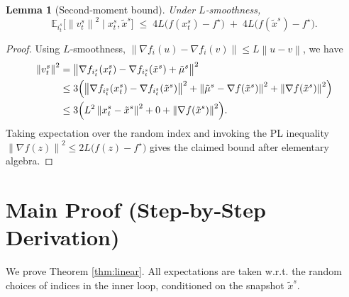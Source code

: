 \documentclass{article}
\newcommand{\E}{\mathbb{E}}
\newcommand{\norm}[1]{\left\lVert#1\right\rVert}
\newtheorem{lemma}{Lemma}
\begin{document}
\begin{lemma}[Second‑moment bound]\label{lem:variance}
Under $L$‑smoothness,
\[
\E_{i_t^{s}}\!\bigl[\norm{v_{t}^{s}}^{2}\mid x_{t}^{s},\tilde{x}^{s}\bigr]
\;\le\;
4L\bigl(f(x_{t}^{s})-f^{\star}\bigr)
\;+\;
4L\bigl(f(\tilde{x}^{s})-f^{\star}\bigr).
\]
\end{lemma}
\begin{proof}
Using $L$‑smoothness, $\norm{\nabla f_i(u)-\nabla f_i(v)}\le L\norm{u-v}$, we have
\[
\begin{aligned}
\norm{v_{t}^{s}}^{2}
&=\norm{\nabla f_{i_t^{s}}(x_{t}^{s})-\nabla f_{i_t^{s}}(\tilde{x}^{s})+\tilde{\mu}^{s}}^{2}\\
&\le 3\Bigl(\norm{\nabla f_{i_t^{s}}(x_{t}^{s})-\nabla f_{i_t^{s}}(\tilde{x}^{s})}^{2}
      +\norm{\tilde{\mu}^{s}-\nabla f(\tilde{x}^{s})}^{2}
      +\norm{\nabla f(\tilde{x}^{s})}^{2}\Bigr)\\
&\le 3\Bigl(L^{2}\norm{x_{t}^{s}-\tilde{x}^{s}}^{2}+0+\norm{\nabla f(\tilde{x}^{s})}^{2}\Bigr).
\end{aligned}
\]
Taking expectation over the random index and invoking the PL inequality
$\norm{\nabla f(z)}^{2}\le 2L\bigl(f(z)-f^{\star}\bigr)$ gives the claimed bound after elementary algebra. \qedhere
\end{proof}

\section*{Main Proof (Step‑by‑Step Derivation)}
We prove Theorem \ref{thm:linear}. All expectations are taken w.r.t. the random choices of indices in the inner loop, conditioned on the snapshot $\tilde{x}^{s}$.
\end{document}
